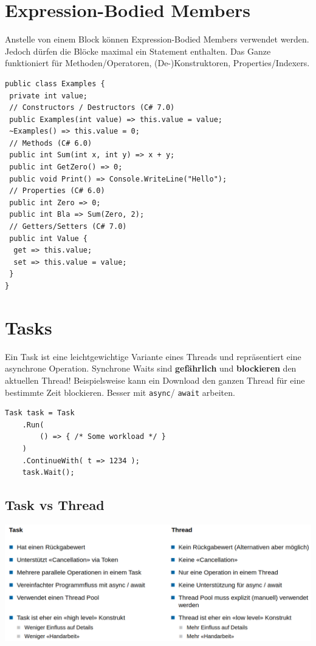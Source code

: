 \documentclass[
a4paper,
oneside,
10pt,
fleqn,
headsepline,
toc=listofnumbered, 
bibliography=totocnumbered]{scrartcl}
\let\stdsection\section
\renewcommand\section{\clearpage\stdsection}
\begin{document}
\section{Expression-Bodied Members}
Anstelle von einem Block{} können Expression-Bodied Members verwendet werden. Jedoch dürfen die Blöcke maximal ein Statement enthalten. Das Ganze funktioniert für Methoden/Operatoren, (De-)Konstruktoren, Properties/Indexers.
\begin{lstlisting}
public class Examples {
 private int value;
 // Constructors / Destructors (C# 7.0)
 public Examples(int value) => this.value = value;
 ~Examples() => this.value = 0;
 // Methods (C# 6.0) 
 public int Sum(int x, int y) => x + y;
 public int GetZero() => 0;
 public void Print() => Console.WriteLine("Hello");
 // Properties (C# 6.0) 
 public int Zero => 0;
 public int Bla => Sum(Zero, 2);
 // Getters/Setters (C# 7.0) 
 public int Value {
  get => this.value;
  set => this.value = value;
 }
}
\end{lstlisting}
\section{Tasks}
Ein Task ist eine leichtgewichtige Variante eines Threads und repräsentiert eine asynchrone Operation. Synchrone Waits sind \textbf{gefährlich} und \textbf{blockieren} den aktuellen Thread! Beispielsweise kann ein Download den ganzen Thread für eine bestimmte Zeit blockieren. Besser mit  \lstinline|async|/ \lstinline|await| arbeiten.
\begin{lstlisting}
Task task = Task
    .Run( 
        () => { /* Some workload */ }
    )
    .ContinueWith( t => 1234 );
    task.Wait();
\end{lstlisting}
\subsection{Task vs Thread}
\begin{minipage}[t]{1\textwidth}
	\centering
	\includegraphics[width=1\linewidth]{images/task_vs_thread.png}
\end{minipage}
\end{document}
